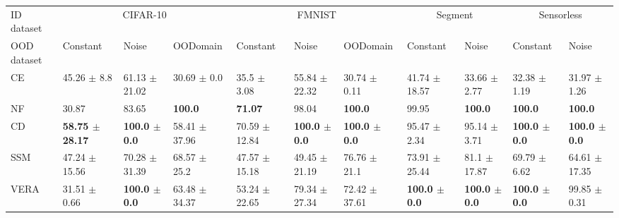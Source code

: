 \begin{tabular}{lllllllllll}
\toprule
ID dataset & \multicolumn{3}{c}{CIFAR-10} & \multicolumn{3}{c}{FMNIST} & \multicolumn{2}{c}{Segment} & \multicolumn{2}{c}{Sensorless} \\
\cmidrule(l){2-4} \cmidrule(l){5-7} \cmidrule(l){8-9} \cmidrule(l){10-11} 
OOD dataset &                                      Constant &                                       Noise &                                     OODomain &                           Constant &                                       Noise &                                    OODomain &                                    Constant &                                       Noise &                                    Constant &                                       Noise \\
\midrule
CE    &               45.26 {\footnotesize $\pm$ 8.8} &           61.13 {\footnotesize $\pm$ 21.02} &              30.69 {\footnotesize $\pm$ 0.0} &    35.5 {\footnotesize $\pm$ 3.08} &           55.84 {\footnotesize $\pm$ 22.32} &            30.74 {\footnotesize $\pm$ 0.11} &           41.74 {\footnotesize $\pm$ 18.57} &            33.66 {\footnotesize $\pm$ 2.77} &            32.38 {\footnotesize $\pm$ 1.19} &            31.97 {\footnotesize $\pm$ 1.26} \\
NF    &                                        30.87  &            83.65 &                                            \bfseries{100.0} &                  \bfseries{71.07 } &            98.04 &                                           \bfseries{100.0} &            99.95  &  \bfseries{100.0} &                           \bfseries{100.0 } &  \bfseries{100.0} \\
\midrule
CD  &  \bfseries{58.75 {\footnotesize $\pm$ 28.17}} &  \bfseries{100.0 {\footnotesize $\pm$ 0.0}} &            58.41 {\footnotesize $\pm$ 37.96} &  70.59 {\footnotesize $\pm$ 12.84} &  \bfseries{100.0 {\footnotesize $\pm$ 0.0}} &  \bfseries{100.0 {\footnotesize $\pm$ 0.0}} &            95.47 {\footnotesize $\pm$ 2.34} &            95.14 {\footnotesize $\pm$ 3.71} &  \bfseries{100.0 {\footnotesize $\pm$ 0.0}} &  \bfseries{100.0 {\footnotesize $\pm$ 0.0}} \\
SSM   &             47.24 {\footnotesize $\pm$ 15.56} &           70.28 {\footnotesize $\pm$ 31.39} &  68.57 {\footnotesize $\pm$ 25.2} &  47.57 {\footnotesize $\pm$ 15.18} &           49.45 {\footnotesize $\pm$ 21.19} &            76.76 {\footnotesize $\pm$ 21.1} &           73.91 {\footnotesize $\pm$ 25.44} &            81.1 {\footnotesize $\pm$ 17.87} &            69.79 {\footnotesize $\pm$ 6.62} &           64.61 {\footnotesize $\pm$ 17.35} \\
VERA  &              31.51 {\footnotesize $\pm$ 0.66} &  \bfseries{100.0 {\footnotesize $\pm$ 0.0}} &            63.48 {\footnotesize $\pm$ 34.37} &  53.24 {\footnotesize $\pm$ 22.65} &           79.34 {\footnotesize $\pm$ 27.34} &           72.42 {\footnotesize $\pm$ 37.61} &  \bfseries{100.0 {\footnotesize $\pm$ 0.0}} &  \bfseries{100.0 {\footnotesize $\pm$ 0.0}} &  \bfseries{100.0 {\footnotesize $\pm$ 0.0}} &            99.85 {\footnotesize $\pm$ 0.31} \\
\bottomrule
\end{tabular}